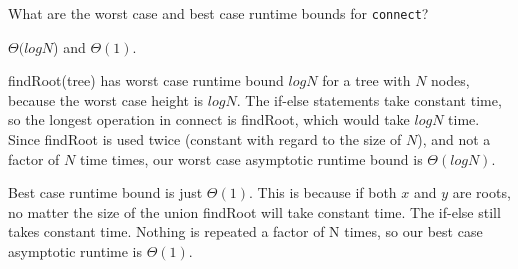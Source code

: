 \question What are the worst case and best case runtime bounds for \lstinline$connect$?

\begin{solution}[1.5in]
$\Theta(log N$) and $\Theta(1)$.

findRoot(tree) has worst case runtime bound $log N$ for a tree with $N$ nodes, because the worst case height is $log N$. The if-else statements take constant time, so the longest operation in connect is findRoot, which would take $log N$ time. Since findRoot is used twice (constant with regard to the size of $N$), and not a factor of $N$ time times, our worst case asymptotic runtime bound is $\Theta(log N)$. 

Best case runtime bound is just $\Theta(1)$. This is because if both $x$ and $y$ are roots, no matter the size of the union findRoot will take constant time. The if-else still takes constant time. Nothing is repeated a factor of N times, so our best case asymptotic runtime is $\Theta(1)$. 

\end{solution}